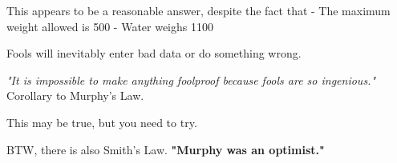 \documentclass[11pt]{article}
\begin{document}
    This appears to be a reasonable answer, despite the fact that - The
maximum weight allowed is 500 - Water weighs 1100

Fools will inevitably enter bad data or do something wrong.

\emph{"It is impossible to make anything foolproof because fools are so
ingenious."} Corollary to Murphy's Law.

This may be true, but you need to try.

BTW, there is also Smith's Law. \textbf{"Murphy was an optimist."}


    
    
    
    
\end{document}

